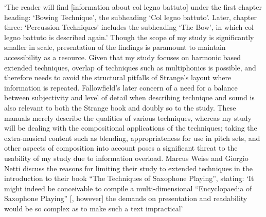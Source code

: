 ‘The reader will find [information about col legno battuto] under the first chapter heading: ‘Bowing Technique’, the subheading ‘Col legno battuto’. Later, chapter three: ‘Percussion Techniques’ includes the subheading ‘The Bow’, in which col legno battuto is described again.’ 
Though the scope of my study is significantly smaller in scale, presentation of the findings is paramount to maintain accessibility as a resource. Given that my study focuses on harmonic based extended techniques, overlap of techniques such as multiphonics is possible, and therefore needs to avoid the structural pitfalls of Strange’s layout where information is repeated. Fallowfield’s later concern of a need for a balance between subjectivity and level of detail when describing technique and sound is also relevant to both the Strange book and doubly so to the study. These manuals merely describe the qualities of various techniques, whereas my study will be dealing with the compositional applications of the techniques; taking the extra-musical content such as blending, appropriateness for use in pitch sets, and other aspects of composition into account poses a significant threat to the usability of my study due to information overload. Marcus Weiss and Giorgio Netti discuss the reasons for limiting their study to extended techniques in the introduction to their book “The Techniques of Saxophone Playing”, stating:
‘It might indeed be conceivable to compile a multi-dimensional “Encyclopaedia of Saxophone Playing” [, however] the demands on presentation and readability would be so complex as to make such a text impractical’ 
